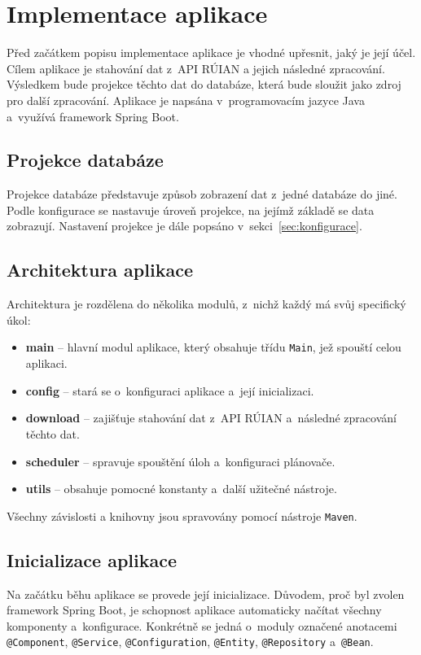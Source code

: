 \chapter{Implementace aplikace}
Před začátkem popisu implementace aplikace je vhodné upřesnit, jaký je její účel.  
Cílem aplikace je stahování dat z~API RÚIAN a jejich následné zpracování.  
Výsledkem bude projekce těchto dat do databáze, která bude sloužit jako zdroj pro další zpracování.  
Aplikace je napsána v~programovacím jazyce Java a~využívá framework Spring Boot.

\section{Projekce databáze}
Projekce databáze představuje způsob zobrazení dat z~jedné databáze do jiné.  
Podle konfigurace se nastavuje úroveň projekce, na jejímž základě se data zobrazují.  
Nastavení projekce je dále popsáno v~sekci~\ref{sec:konfigurace}.

\section{Architektura aplikace}
Architektura je rozdělena do několika modulů, z~nichž každý má svůj specifický úkol:
\begin{itemize}[itemsep=0pt]
    \item \textbf{main} -- hlavní modul aplikace, který obsahuje třídu \texttt{Main}, jež spouští celou aplikaci.
    \item \textbf{config} -- stará se o~konfiguraci aplikace a~její inicializaci.
    \item \textbf{download} -- zajišťuje stahování dat z~API RÚIAN a~následné zpracování těchto dat.
    \item \textbf{scheduler} -- spravuje spouštění úloh a~konfiguraci plánovače.
    \item \textbf{utils} -- obsahuje pomocné konstanty a~další užitečné nástroje.
\end{itemize}
Všechny závislosti a knihovny jsou spravovány pomocí nástroje \texttt{Maven}.

\section{Inicializace aplikace}
Na začátku běhu aplikace se provede její inicializace.  
Důvodem, proč byl zvolen framework Spring Boot, je schopnost aplikace automaticky načítat všechny komponenty a~konfigurace.  
Konkrétně se jedná o~moduly označené anotacemi \texttt{@Component}, \texttt{@Service}, \texttt{@Configuration}, \texttt{@Entity}, \texttt{@Repository} a~\texttt{@Bean}.

